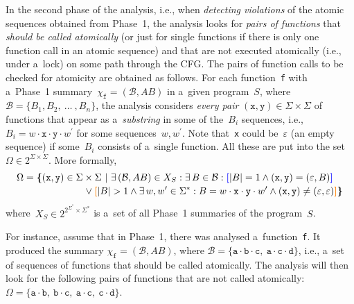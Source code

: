 In the second phase of the analysis, i.e., when \emph{detecting violations} of the atomic sequences obtained from Phase~1, the analysis looks for \emph{pairs of functions} that \emph{should be called atomically} (or just for single functions if there is only one function call in an atomic sequence) and that are not executed atomically (i.e., under a~lock) on some path through the CFG. The pairs of function calls to be checked for atomicity are obtained as follows. For each function~\texttt{f} with a~Phase~1 summary~$ \chi_\mathtt{f} = (\mathcal{B}, AB) $ in a~given program~$ S $, where $ \mathcal{B} = \{B_1, B_2,\ \ldots\ , B_n\} $, the analysis considers \emph{every pair} $ (\mathtt{x}, \mathtt{y}) \in \Sigma \times \Sigma $ of functions that appear as a~\emph{substring} in some of the~$ B_i $ sequences, i.e., $ B_i = w \cdot \mathtt{x} \cdot \mathtt{y} \cdot w^\prime $ for some sequences~$ w, w^\prime $. Note that~\texttt{x} could be~$ \varepsilon $ (an empty sequence) if some~$ B_i $ consists of a~single function. All these  are put into the set $ \Omega \in 2^{\Sigma \times \Sigma} $. More formally, 
$$
\begin{multlined}
    \Omega = \bb{\{}(\mathtt{x}, \mathtt{y}) \in \Sigma \times \Sigma\ |\ \exists\,(\mathcal{B}, AB) \in X_S : \exists\,B \in \mathcal{B} : \bA{[}|B| = 1 \wedge (\mathtt{x}, \mathtt{y}) = (\varepsilon, B)\bA{]} \\
%
    \vee \bB{[}|B| > 1 \wedge \exists\,w, w^\prime \in \Sigma^* : B = w \cdot \mathtt{x} \cdot \mathtt{y} \cdot w^\prime \wedge (\mathtt{x}, \mathtt{y}) \neq (\varepsilon, \varepsilon)%
%
    \bB{]}\bb{\}}
\end{multlined}
$$
where~$ X_S \in 2^{2^{\Sigma^*} \times \Sigma^*} $ is a~set of all Phase~1 summaries of the program~$ S $.

\begin{example}
    For instance, assume that in Phase~1, there was analysed a~function~\texttt{f}. It produced the summary $ \chi_\mathtt{f} = (\mathcal{B}, AB) $, where $ \mathcal{B} = \{\mathtt{a} \cdot \mathtt{b} \cdot \mathtt{c},\ \mathtt{a} \cdot \mathtt{c} \cdot \mathtt{d}\} $, i.e., a~set of sequences of functions that should be called atomically. The analysis will then look for the following pairs of functions that are not called atomically: $ \Omega = \{\mathtt{a} \cdot \mathtt{b},\ \mathtt{b} \cdot \mathtt{c},\ \mathtt{a} \cdot \mathtt{c},\ \mathtt{c} \cdot \mathtt{d}\} $.
\end{example}

